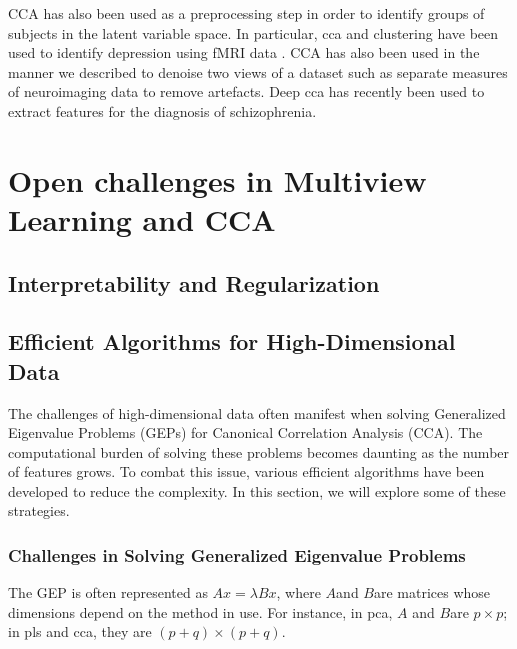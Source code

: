 CCA has also been used as a preprocessing step in order to identify groups of subjects in the latent variable space.
In particular, \acrshort{cca} and clustering have been used to identify depression using fMRI data\citep{dinga2019evaluating} \citep{drysdale2017resting}.
CCA has also been used in the manner we described to denoise two \gls{views} of a dataset such as separate measures of neuroimaging data \citep{zhuang2020technical} to remove artefacts.
Deep \acrshort{cca} has recently been used to extract features for the diagnosis of schizophrenia\citep{qi2016deep}.

\section{Open challenges in Multiview Learning and CCA}

\subsection{Interpretability and Regularization}



\subsection{Efficient Algorithms for High-Dimensional Data}

The challenges of high-dimensional data often manifest when solving Generalized Eigenvalue Problems (GEPs) for Canonical Correlation Analysis (CCA). The computational burden of solving these problems becomes daunting as the number of features grows.
To combat this issue, various efficient algorithms have been developed to reduce the complexity.
In this section, we will explore some of these strategies.

\subsubsection{Challenges in Solving Generalized Eigenvalue Problems}

The GEP is often represented as \( Ax = \lambda Bx \), where \( A \)and \( B \)are matrices whose dimensions depend on the method in use.
For instance, in \acrshort{pca}, \( A \) and \( B \)are \( p \times p \); in \acrshort{pls} and \acrshort{cca}, they are \( (p+q) \times (p+q) \).

